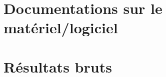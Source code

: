 \noindent
  \begin{minipage}[c]{\textwidth}
    \centering
  \end{minipage}
\section{Documentations sur le matériel/logiciel}

\newpage

\section{Résultats bruts}


\newpage

